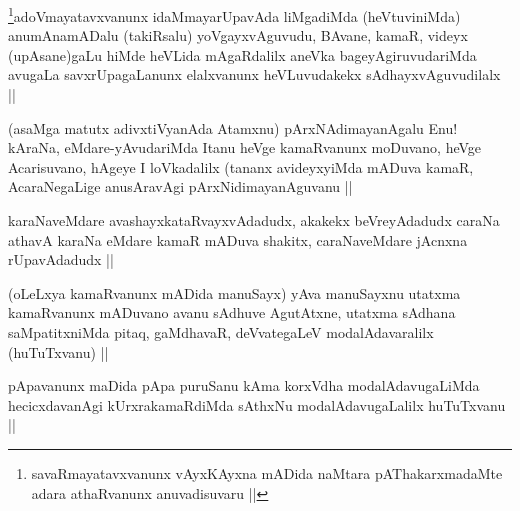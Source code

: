 
\begin{artha}
\footnote{savaRmayatavxvanunx vAyxKAyxna mADida naMtara
  pAThakarxmadaMte adara athaRvanunx anuvadisuvaru ||}adoVmayatavxvanunx idaMmayarUpavAda liMgadiMda
(heVtuviniMda) anumAnamADalu (takiRsalu) yoVgayxvAguvudu, BAvane,
kamaR, videyx (upAsane)gaLu hiMde heVLida mAgaRdalilx aneVka
bageyAgiruvudariMda avugaLa savxrUpagaLanunx elalxvanunx heVLuvudakekx
sAdhayxvAguvudilalx ||
\end{artha}

\begin{artha}
(asaMga matutx adivxtiVyanAda Atamxnu) pArxNAdimayanAgalu Enu!
  kAraNa, eMdare-yAvudariMda Itanu heVge kamaRvanunx moDuvano, heVge
  Acarisuvano, hAgeye I loVkadalilx (tananx avideyxyiMda mADuva kamaR,
 AcaraNegaLige anusAravAgi pArxNidimayanAguvanu ||
\end{artha}


\begin{artha}
karaNaveMdare avashayxkataRvayxvAdadudx, akakekx beVreyAdadudx caraNa
athavA karaNa eMdare kamaR mADuva shakitx, caraNaveMdare jAcnxna
rUpavAdadudx ||
\end{artha}


\begin{artha}
(oLeLxya kamaRvanunx mADida manuSayx) yAva manuSayxnu utatxma
  kamaRvanunx mADuvano avanu sAdhuve AgutAtxne, utatxma sAdhana
  saMpatitxniMda pitaq, gaMdhavaR, deVvategaLeV modalAdavaralilx
  (huTuTxvanu) ||
\end{artha}

\begin{artha}
pApavanunx maDida pApa puruSanu kAma korxVdha modalAdavugaLiMda
hecicxdavanAgi kUrxrakamaRdiMda sAthxNu modalAdavugaLalilx huTuTxvanu ||
\end{artha}
